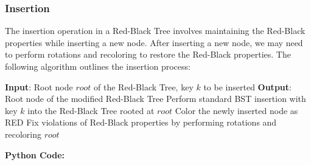 \documentclass[12pt]{book} %
\begin{document}
\subsubsection{Insertion}
The insertion operation in a Red-Black Tree involves maintaining the Red-Black properties while inserting a new node. After inserting a new node, we may need to perform rotations and recoloring to restore the Red-Black properties. The following algorithm outlines the insertion process:
\FloatBarrier
\begin{algorithm}
\caption{Insertion in Red-Black Tree}
\begin{algorithmic}[1]
\State \textbf{Input}: Root node \(root\) of the Red-Black Tree, key \(k\) to be inserted
\State \textbf{Output}: Root node of the modified Red-Black Tree
    \State Perform standard BST insertion with key \(k\) into the Red-Black Tree rooted at \(root\)
    \State Color the newly inserted node as RED
    \State Fix violations of Red-Black properties by performing rotations and recoloring
    \Return \(root\)
\EndFunction
\end{algorithmic}
\end{algorithm}
\FloatBarrier
\textbf{Python Code:}
\FloatBarrier
\end{document}
